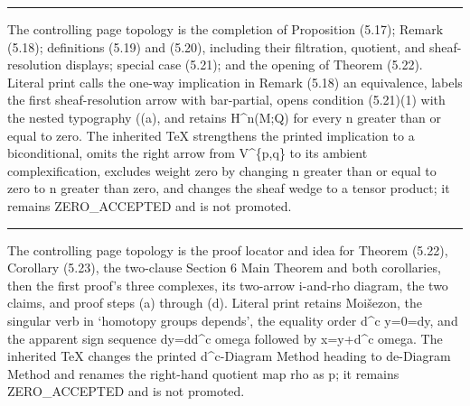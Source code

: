\documentclass[
  english,
  a3paper,
  a3paper]{extarticle}
\begin{document}
\par

\vspace{0.7mm}\hrule\vspace{1.6mm}

\fontsize{11}{14}\selectfont

The controlling page topology is the completion of Proposition (5.17);
Remark (5.18); definitions (5.19) and (5.20), including their
filtration, quotient, and sheaf-resolution displays; special case
(5.21); and the opening of Theorem (5.22). Literal print calls the
one-way implication in Remark (5.18) an equivalence, labels the first
sheaf-resolution arrow with bar-partial, opens condition (5.21)(1) with
the nested typography ((a), and retains H\^{}n(M;Q) for every n greater
than or equal to zero. The inherited TeX strengthens the printed
implication to a biconditional, omits the right arrow from V\^{}\{p,q\}
to its ambient complexification, excludes weight zero by changing n
greater than or equal to zero to n greater than zero, and changes the
sheaf wedge to a tensor product; it remains ZERO\_ACCEPTED and is not
promoted.

\clearpage



\par

\vspace{0.7mm}\hrule\vspace{1.6mm}

\fontsize{11}{14}\selectfont

The controlling page topology is the proof locator and idea for Theorem
(5.22), Corollary (5.23), the two-clause Section 6 Main Theorem and both
corollaries, then the first proof's three complexes, its two-arrow
i-and-rho diagram, the two claims, and proof steps (a) through (d).
Literal print retains Moišezon, the singular verb in `homotopy groups
depends', the equality order d\^{}c y=0=dy, and the apparent sign
sequence dy=dd\^{}c omega followed by x=y+d\^{}c omega. The inherited
TeX changes the printed d\^{}c-Diagram Method heading to de-Diagram
Method and renames the right-hand quotient map rho as p; it remains
ZERO\_ACCEPTED and is not promoted.

\clearpage

\end{document}
